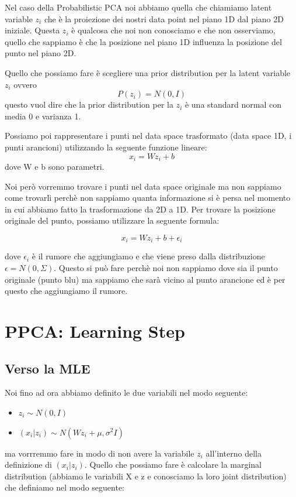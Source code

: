 \documentclass[14pt]{extreport}
\begin{document}
Nel caso della Probabilistic PCA noi abbiamo quella che chiamiamo latent variable $z_i$ che è la proiezione dei nostri data point nel piano 1D dal
piano 2D iniziale. Questa $z_i$ è qualcosa che noi non conosciamo e che non osserviamo, quello che sappiamo è che la posizione nel piano 1D influenza
la posizione del punto nel piano 2D.

Quello che possiamo fare è scegliere una prior distribution per la latent variable $z_i$ ovvero $$P(z_i) = N(0,I)$$ questo vuol dire che la prior
distribution per la $z_i$ è una standard normal con media 0 e varianza 1.

Possiamo poi rappresentare i punti nel data space trasformato (data space 1D, i punti arancioni) utilizzando la seguente funzione lineare: $$x_i = W
z_i + b$$ dove W e b sono parametri.

Noi però vorremmo trovare i punti nel data space originale ma non sappiamo come trovarli perchè non sappiamo quanta informazione si è persa nel
momento in cui abbiamo fatto la trasformazione da 2D a 1D. Per trovare la posizione originale del punto, possiamo utilizzare la seguente formula:

$$x_i = W z_i + b + \epsilon_i$$

dove $\epsilon_i$ è il rumore che aggiungiamo e che viene preso dalla distribuzione $\epsilon = N(0, \Sigma)$. Questo si può fare perchè noi non
sappiamo dove sia il punto originale (punto blu) ma sappiamo che sarà vicino al punto arancione ed è per questo che aggiungiamo il rumore.




\section{PPCA: Learning Step}

\subsection{Verso la MLE}

Noi fino ad ora abbiamo definito le due variabili nel modo seguente:

\begin{itemize}
	\item $z_i \sim N(0, I)$
	\item $(x_i | z_i) \sim N(Wz_i + \mu, \sigma^2I)$
\end{itemize}

ma vorrremmo fare in modo di non avere la variabile $z_i$ all'interno della definizione di $(x_i | z_i)$. Quello che possiamo fare è calcolare la
marginal distribution (abbiamo le variabili X e z e conosciamo la loro joint distribution) che definiamo nel modo seguente:
\end{document}
